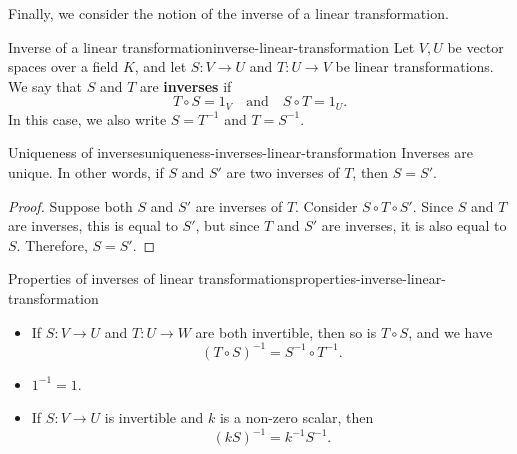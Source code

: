 Finally, we consider the notion of the inverse of a linear
transformation.

\begin{definition}{Inverse of a linear transformation}{inverse-linear-transformation}
  Let $V,U$ be vector spaces over a field $K$, and let $S:V\to U$ and
  $T:U\to V$ be linear transformations.  We say that $S$ and $T$ are
  \textbf{inverses}%
   if
  \begin{equation*}
    T\circ S = 1_V
    \quad\mbox{and}\quad
    S\circ T = 1_U.
  \end{equation*}
  In this case, we also write $S=T^{-1}$ and $T=S^{-1}$.
\end{definition}

\begin{proposition}{Uniqueness of inverses}{uniqueness-inverses-linear-transformation}
  Inverses are unique. In other words, if $S$ and $S'$ are two inverses
  of $T$, then $S=S'$.
\end{proposition}

\begin{proof}
  Suppose both $S$ and $S'$ are inverses of $T$. Consider
  $S\circ T\circ S'$. Since $S$ and $T$ are inverses, this is equal to
  $S'$, but since $T$ and $S'$ are inverses, it is also equal to
  $S$. Therefore, $S=S'$.
\end{proof}

\begin{proposition}{Properties of inverses of linear transformations}{properties-inverse-linear-transformation}
  \begin{itemize}
  \item If $S:V\to U$ and $T:U\to W$ are both invertible, then so is
    $T\circ S$, and we have
    \begin{equation*}
      (T\circ S)^{-1} = S^{-1}\circ T^{-1}.
    \end{equation*}
  \item $1^{-1} = 1$.
  \item If $S:V\to U$ is invertible and $k$ is a non-zero scalar, then
    \begin{equation*}
      (kS)^{-1} = k^{-1}S^{-1}.
    \end{equation*}
  \end{itemize}
\end{proposition}
